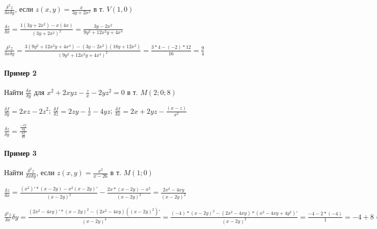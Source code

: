 \documentclass{article}
\begin{document}
\begin{flushleft}
\hfill

\hfill

$\frac{\delta^2 z}{\delta x \delta y}$, если $z(x, y) = \frac{x}{3y + 2x^2}$ в т. $V(1, 0)$

$\frac{\delta z}{\delta x} = \frac{1(3y + 2x^2) - x(4x)}{(3y + 2x^2)^2} = \frac{3y - 2x^2}{9y^2 + 12x^2 y + 4x^4}$

$\frac{\delta^2 z}{\delta x \delta y} = \frac{3(9y^2 + 12x^2 y + 4x^4) - (3y - 2x^2)(18y + 12x^2)}{(9y^2 + 12x^2 y + 4x^4)^2} = \frac{3 * 4 - (-2) * 12}{16} = \frac{9}{4}$

\paragraph{Пример 2}

\hfill

\hfill

Найти $\frac{\delta x}{\delta y}$ для $x^2 + 2xyz - \frac{z}{x} - 2yz^2 = 0$ в т. $M(2; 0; 8)$

$\frac{\delta f}{\delta y} = 2xz - 2z^2$; $\frac{\delta f}{\delta z} = 2zy - \frac{1}{x} - 4yz$; $\frac{\delta f}{\delta x} = 2x + 2yz - \frac{(x - z)}{x^2}$

$\frac{\delta z}{\delta y} = \frac{\frac{- \delta f}{\delta y}}{\frac{\delta f}{\delta z}}$


\paragraph{Пример 3}

\hfill

\hfill

Найти $\frac{\delta^2 z}{\delta x \delta y}$, если $z(x, y) = \frac{x^2}{x - 26}$ в т. $M(1; 0)$

$\frac{\delta z}{\delta x} = \frac{(x^2)' * (x - 2y) - x^2(x - 2y)'}{(x - 2y)^2} - \frac{2x * (x - 2y) - x^2}{(x - 2y)^2} = \frac{2x^2 - 4x y}{(x - 2y)^2}$

$\frac{\delta^2 z}{\delta x}{\delta y} = \frac{(2x^2 - 4xy)' * (x - 2y)^2 - (2x^2 - 4xy)((x - 2y)^2)'}{(x - 2y)^4} = \frac{(-4) * (x - 2y)^2 - (2x^2 - 4xy) * (x^2 - 4x y + 4y^2)'}{(x - 2y)^2} = \frac{-4 - 2 * (-4)}{1} = -4 + 8 = 4$

\end{flushleft}
\end{document}
